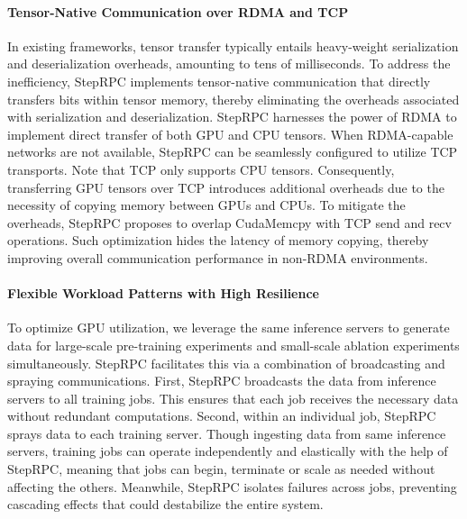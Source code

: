 \paragraph{Tensor-Native Communication over RDMA and TCP} In existing frameworks, tensor transfer typically entails heavy-weight serialization and deserialization overheads, amounting to tens of milliseconds. To address the inefficiency, StepRPC implements tensor-native communication that directly transfers bits within tensor memory, thereby eliminating the overheads associated with serialization and deserialization. StepRPC harnesses the power of RDMA to implement direct transfer of both GPU and CPU tensors. When RDMA-capable networks are not available, StepRPC can be seamlessly configured to utilize TCP transports. Note that TCP only supports CPU tensors. Consequently, transferring GPU tensors over TCP introduces additional overheads due to the necessity of copying memory between GPUs and CPUs. To mitigate the overheads, StepRPC proposes to overlap CudaMemcpy with TCP send and recv operations. Such optimization hides the latency of memory copying, thereby improving overall communication performance in non-RDMA environments.


\paragraph{Flexible Workload Patterns with High Resilience} To optimize GPU utilization, we leverage the same inference servers to generate data for large-scale pre-training experiments and small-scale ablation experiments simultaneously. StepRPC facilitates this via a combination of broadcasting and spraying communications. First, StepRPC broadcasts the data from inference servers to all training jobs. This ensures that each job receives the necessary data without redundant computations. Second, within an individual job, StepRPC sprays data to each training server. Though ingesting data from same inference servers, training jobs can operate independently and elastically with the help of StepRPC, meaning that jobs can begin, terminate or scale as needed without affecting the others. Meanwhile, StepRPC isolates failures across jobs, preventing cascading effects that could destabilize the entire system.

